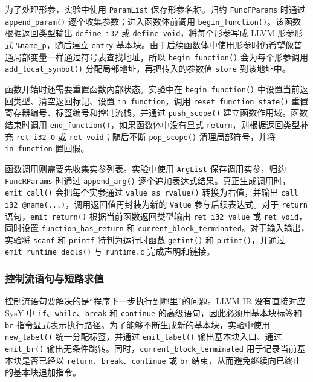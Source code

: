 \documentclass[12pt]{ctexart}
\begin{document}
为了处理形参，实验中使用 \texttt{ParamList} 保存形参名称。归约 \texttt{FuncFParams} 时通过 \texttt{append\_param()} 逐个收集参数；进入函数体前调用 \texttt{begin\_function()}。该函数根据返回类型输出 \texttt{define i32} 或 \texttt{define void}，将每个形参写成 LLVM 形参形式 \texttt{\%name\_p}，随后建立 \texttt{entry} 基本块。由于后续函数体中使用形参时仍希望像普通局部变量一样通过符号表查找地址，所以 \texttt{begin\_function()} 会为每个形参调用 \texttt{add\_local\_symbol()} 分配局部地址，再把传入的参数值 \texttt{store} 到该地址中。

函数开始时还需要重置函数内部状态。实验中在 \texttt{begin\_function()} 中设置当前返回类型、清空返回标记、设置 \texttt{in\_function}，调用 \texttt{reset\_function\_state()} 重置寄存器编号、标签编号和控制流栈，并通过 \texttt{push\_scope()} 建立函数作用域。函数结束时调用 \texttt{end\_function()}，如果函数体中没有显式 \texttt{return}，则根据返回类型补充 \texttt{ret i32 0} 或 \texttt{ret void}；随后不断 \texttt{pop\_scope()} 清理局部符号，并将 \texttt{in\_function} 置回假。

函数调用则需要先收集实参列表。实验中使用 \texttt{ArgList} 保存调用实参，归约 \texttt{FuncRParams} 时通过 \texttt{append\_arg()} 逐个追加表达式结果。真正生成调用时，\texttt{emit\_call()} 会把每个实参通过 \texttt{value\_as\_rvalue()} 转换为右值，并输出 \texttt{call i32 @name(...)}，调用返回值再封装为新的 \texttt{Value} 参与后续表达式。对于 \texttt{return} 语句，\texttt{emit\_return()} 根据当前函数返回类型输出 \texttt{ret i32 value} 或 \texttt{ret void}，同时设置 \texttt{function\_has\_return} 和 \texttt{current\_block\_terminated}。对于输入输出，实验将 \texttt{scanf} 和 \texttt{printf} 特判为运行时函数 \texttt{getint()} 和 \texttt{putint()}，并通过 \texttt{emit\_runtime\_decls()} 与 \texttt{runtime.c} 完成声明和链接。

\subsubsection{控制流语句与短路求值}

控制流语句要解决的是“程序下一步执行到哪里”的问题。LLVM IR 没有直接对应 SysY 中 \texttt{if}、\texttt{while}、\texttt{break} 和 \texttt{continue} 的高级语句，因此必须用基本块标签和 \texttt{br} 指令显式表示执行路径。为了能够不断生成新的基本块，实验中使用 \texttt{new\_label()} 统一分配标签，并通过 \texttt{emit\_label()} 输出基本块入口、通过 \texttt{emit\_br()} 输出无条件跳转。同时，\texttt{current\_block\_terminated} 用于记录当前基本块是否已经以 \texttt{return}、\texttt{break}、\texttt{continue} 或 \texttt{br} 结束，从而避免继续向已终止的基本块追加指令。
\end{document}
